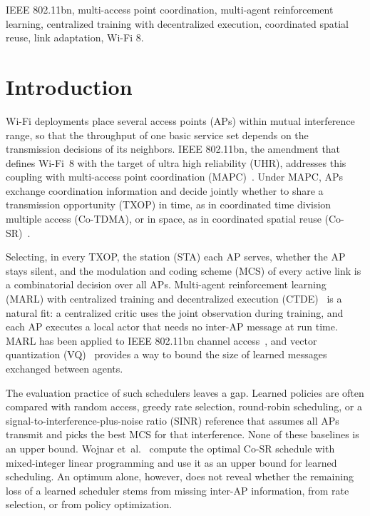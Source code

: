 \documentclass{ieeeaccess}
\begin{document}
\begin{keywords}
IEEE 802.11bn, multi-access point coordination, multi-agent reinforcement learning, centralized training with decentralized execution, coordinated spatial reuse, link adaptation, Wi-Fi 8.
\end{keywords}

\titlepgskip=-21pt

\maketitle

\section{Introduction}
\label{sec:introduction}
 Wi-Fi deployments place several access points (APs) within mutual interference range, so that the throughput of one basic service set depends on the transmission decisions of its neighbors. IEEE 802.11bn, the amendment that defines Wi-Fi~8 with the target of ultra high reliability (UHR), addresses this coupling with multi-access point coordination (MAPC)~\cite{galati2024wifi8}. Under MAPC, APs exchange coordination information and decide jointly whether to share a transmission opportunity (TXOP) in time, as in coordinated time division multiple access (Co-TDMA), or in space, as in coordinated spatial reuse (Co-SR)~\cite{lopez2019ieee}.

Selecting, in every TXOP, the station (STA) each AP serves, whether the AP stays silent, and the modulation and coding scheme (MCS) of every active link is a combinatorial decision over all APs. Multi-agent reinforcement learning (MARL) with centralized training and decentralized execution (CTDE)~\cite{lowe2017maddpg,foerster2018coma,yu2022mappo} is a natural fit: a centralized critic uses the joint observation during training, and each AP executes a local actor that needs no inter-AP message at run time. MARL has been applied to IEEE 802.11bn channel access~\cite{yan2025marl}, and vector quantization (VQ)~\cite{vandenoord2017vqvae} provides a way to bound the size of learned messages exchanged between agents.

The evaluation practice of such schedulers leaves a gap. Learned policies are often compared with random access, greedy rate selection, round-robin scheduling, or a signal-to-interference-plus-noise ratio (SINR) reference that assumes all APs transmit and picks the best MCS for that interference. None of these baselines is an upper bound. Wojnar et~al.~\cite{wojnar2025csr} compute the optimal Co-SR schedule with mixed-integer linear programming and use it as an upper bound for learned scheduling. An optimum alone, however, does not reveal whether the remaining loss of a learned scheduler stems from missing inter-AP information, from rate selection, or from policy optimization.
\end{document}
